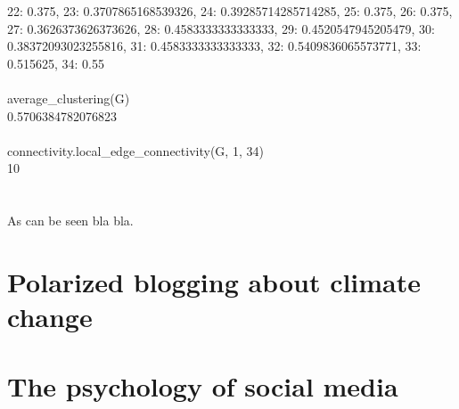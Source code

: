 \documentclass[11pt]{article}
\begin{document}
22: 0.375, 23: 0.3707865168539326, 24: 0.39285714285714285, 25: 0.375,
26: 0.375, 27: 0.3626373626373626, 28: 0.4583333333333333, 29: 0.4520547945205479,
30: 0.38372093023255816, 31: 0.4583333333333333, 32: 0.5409836065573771, 33: 0.515625, 34: 0.55
\\\\
average\_clustering(G)\\
0.5706384782076823
\\\\
connectivity.local\_edge\_connectivity(G, 1, 34)\\
10\\
\\\\
As can be seen bla bla.

\section{Polarized blogging about climate change}


\section{The psychology of social media}


\pagebreak


\end{document}
